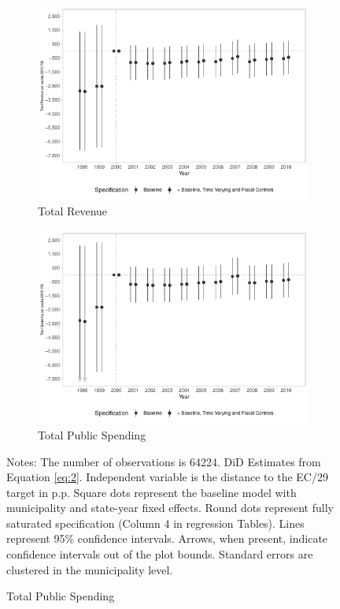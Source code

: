 \begin{figure}[h!]
    \begin{center}
    \caption{Fiscal Reactions}\label{fig:b1}
    \begin{subfigure}{0.49\textwidth}
        \caption{\scriptsize Total Revenue}\label{fig:b1a}
        \centering
        \includegraphics[width=\textwidth]{plots/finbra_reccorr_pcapita_dist_ec29_baseline_dist_ec29_baseline_B1.pdf}
    \end{subfigure}
    \begin{subfigure}{0.49\textwidth}
        \centering
        \caption{\scriptsize Total Public Spending}\label{fig:b1b}
        \includegraphics[width=\textwidth]{plots/finbra_desp_o_pcapita_dist_ec29_baseline_dist_ec29_baseline_B1.pdf}
    \end{subfigure}
    
    \end{center}
    \scriptsize{Notes: The number of observations is 64224. DiD Estimates from Equation \ref{eq:2}. Independent variable is the distance to the EC/29 target in p.p. Square dots represent the baseline model with municipality and state-year fixed effects. Round dots represent fully saturated specification (Column 4 in regression Tables). Lines represent 95\% confidence intervals. Arrows, when present, indicate confidence intervals out of the plot bounds. Standard errors are clustered in the municipality level.}
    
\end{figure}